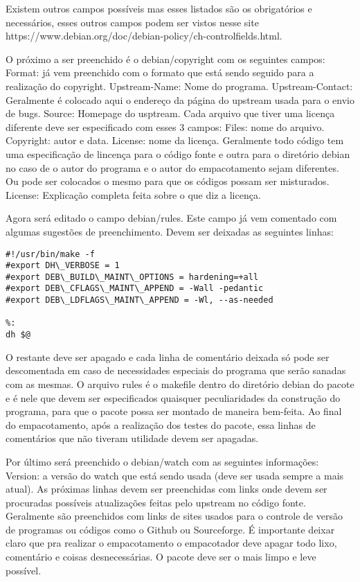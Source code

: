 Existem outros campos possíveis mas esses listados são os obrigatórios e necessários, esses outros campos podem ser vistos nesse site https://www.debian.org/doc/debian-policy/ch-controlfields.html. 

O próximo a ser preenchido é o debian/copyright com os seguintes campos:
Format: já vem preenchido com o formato que está sendo seguido para a realização do  copyright.
Upstream-Name: Nome do programa.
Upstream-Contact: Geralmente é colocado aqui o endereço da página do upstream usada para o envio de bugs.
Source: Homepage do usptream.
Cada arquivo que tiver uma licença diferente deve ser especificado com esses 3 campos:
Files: nome do arquivo.
Copyright: autor e data.
License: nome da licença.
Geralmente todo código tem uma especificação de lincença  para o código fonte e outra para o diretório debian no caso de o autor do programa e o autor do empacotamento sejam diferentes. Ou pode ser colocados o mesmo para que os códigos possam ser misturados.
License: Explicação completa feita sobre o que diz a licença. 

Agora será editado o campo debian/rules. Este campo já vem comentado com algumas sugestões de preenchimento. Devem ser deixadas as seguintes linhas:
\begin{verbatim}
#!/usr/bin/make -f
#export DH\_VERBOSE = 1
#export DEB\_BUILD\_MAINT\_OPTIONS = hardening=+all
#export DEB\_CFLAGS\_MAINT\_APPEND = -Wall -pedantic
#export DEB\_LDFLAGS\_MAINT\_APPEND = -Wl, --as-needed

%:
dh $@

\end{verbatim}
O restante deve ser apagado e cada linha de comentário deixada só pode ser descomentada em caso de necessidades especiais do programa que serão sanadas com as mesmas. O arquivo rules é o makefile dentro do diretório debian do pacote e é nele que devem ser especificados quaisquer peculiaridades da construção do programa, para que o pacote possa ser montado de maneira bem-feita. Ao final do empacotamento, após a realização dos testes do pacote, essa linhas de comentários que não tiveram utilidade devem ser apagadas.

Por último será preenchido o debian/watch com as seguintes informações:
Version: a versão do watch que está sendo usada (deve ser usada sempre a mais atual).
As próximas linhas devem ser preenchidas com links onde devem ser procuradas possíveis atualizações feitas pelo upstream no código fonte. Geralmente são preenchidos com links de sites usados para o controle de versão de programas ou códigos como o Github ou Sourceforge.
É importante deixar claro que pra realizar o empacotamento o empacotador deve apagar todo lixo, comentário e coisas desnecessárias. O pacote deve ser o mais limpo e leve possível.

